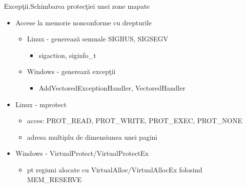 \documentclass{so.cs.pub.ro}
\begin{document}
\begin{frame}{Excepţii.Schimbarea protecţiei unei zone mapate}
\begin{itemize}
  \item Accese la memorie nonconforme cu drepturile
  \begin{itemize}
    \item Linux - generează semnale SIGBUS, SIGSEGV
    \begin{itemize}
      \item sigaction, siginfo_t
    \end{itemize}
    \vspace{0.3cm}
    \item Windows - generează excepţii
    \begin{itemize}
      \item AddVectoredExceptionHandler, VectoredHandler
    \end{itemize}
  \end{itemize}
  \vspace{0.5cm}
  \item Linux - mprotect
  \begin{itemize}
    \item acces: PROT_READ, PROT_WRITE, PROT_EXEC, PROT_NONE
    \item adresa multiplu de dimensiunea unei pagini
  \end{itemize}
  \vspace{0.3cm}
  \item Windows - VirtualProtect/VirtualProtectEx
  \begin{itemize}
    \item pt regiuni alocate cu VirtualAlloc/VirtualAllocEx folosind MEM_RESERVE
  \end{itemize}
\end{itemize}
\end{frame}
\end{document}
